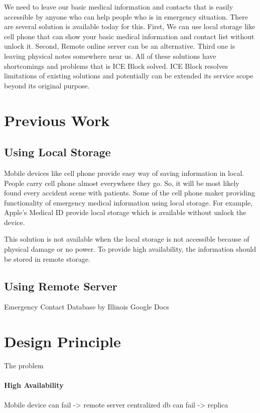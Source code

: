 \documentclass[conference]{IEEEtran}
\begin{document}
We need to leave our basic medical information and contacts that is easily accessible by anyone who can help people who is in emergency situation.
There are several solution is available today for this.
First, We can use local storage like cell phone that can show your basic medical information and contact list without unlock it. 
Second, Remote online server can be an alternative.
Third one is leaving physical notes somewhere near us.
All of these solutions have shortcomings and problems that is ICE Block solved.
ICE Block resolves limitations of existing solutions and potentially can be extended its service scope
beyond its original purpose. 


\section{Previous Work}

\subsection{Using Local Storage}
Mobile devices like cell phone provide easy way of saving information in local.
People carry cell phone almost everywhere they go. So, it will be most likely found every accident scene with patients.
Some of the cell phone maker providing functionality of emergency medical information using local storage.
For example, Apple's Medical ID\cite{r1} provide local storage which is available without unlock the device.



This solution is not available when the local storage is not accessible
because of physical damage or no power.
To provide high availability, the information should be stored in remote storage.

\subsection{Using Remote Server}
Emergency Contact Database by Illinois
Google Docs


\section{Design Principle}
The problem 

\paragraph{High Availability}
Mobile device can fail -> remote server
centralized db can fail -> replica
\end{document}
